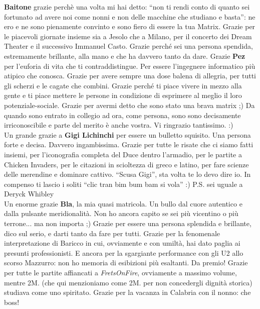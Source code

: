 \documentclass[10pt]{amsart}
\newcommand{\n}[1]{{\Large \bf #1}}
\begin{document}
\n{Baitone} grazie perchè una volta mi hai detto: ``non ti rendi conto di quanto sei fortunato ad avere noi come nonni e non delle macchine che studiano e basta'': ne ero e ne sono pienamente convinto e sono fiero di essere la tua Matrix. Grazie per le piacevoli giornate insieme sia a Jesolo che a Milano, per il concerto dei Dream Theater e il successivo Immanuel Casto. Grazie perché sei una persona spendida, estremamente brillante, alla mano e che ha davvero tanto da dare. 
Grazie \n{Pez} per l'euforia di vita che ti contraddistingue. Per essere l'ingegnere informatico più atipico che conosca. Grazie per avere sempre una dose balena di allegria, per tutti gli scherzi e le cagate che combini. Grazie perché ti piace vivere in mezzo alla gente e ti piace mettere le persone in condizione di esprimere al meglio il loro potenziale-sociale. Grazie per avermi detto che sono stato una brava matrix ;) Da quando sono entrato in collegio ad ora, come persona, sono sono decisamente irriconoscibile e parte del merito è anche vostra. Vi ringrazio tantissimo. :)\\

Un grande grazie a \n{Gigi Lichinchi} per essere un bulletto squisito. Una persona forte e decisa. Davvero ingambissima. Grazie per tutte le risate che ci siamo fatti insiemi, per l'iconografia completa del Duce dentro l'armadio, per le partite a Chicken Invaders, per le citazioni in scioltezza di greco e latino, per fare scienze delle merendine e dominare cattivo. ``Scusa Gigi'', sta volta te lo devo dire io. In compenso ti lascio i soliti ``clic tran bim bum bam si vola'' :) P.S. sei uguale a Deryck  Whibley\\

 Un enorme grazie \n{Bla}, la mia quasi matricola. Un bullo dal cuore autentico e dalla pulsante meridionalità. Non ho ancora capito se sei più vicentino o più terrone... ma non importa ;) Grazie per essere una persona splendida e brillante, dico sul serio, e darti tanto da fare per tutti. Grazie per la fenomenale interpretazione di Baricco in cui, ovviamente e con umiltà, hai dato paglia ai presunti professionisti. E ancora per la sgargiante performance con gli U2 allo scorso Mazzurro: non ho memoria di esibizioni più esaltanti. Da premio! Grazie per tutte le partite affiancati a \emph{FretsOnFire}, ovviamente a massimo volume, mentre 2M. (che qui menzioniamo come 2M. per non concedergli dignità storica) studiava come uno spiritato. Grazie per la vacanza in Calabria con il nonno: che boss!\\
\end{document}
